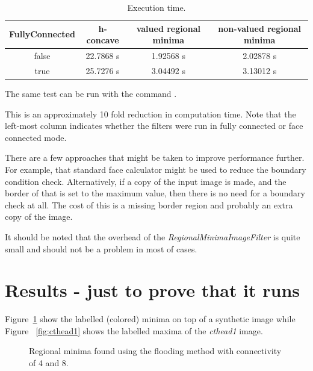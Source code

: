 \documentclass{InsightArticle}
\begin{document}
\begin{table}[htbp]
\centering
\begin{tabular}{cccc}
\hline
FullyConnected & h-concave & valued regional minima & non-valued regional minima \\
\hline
\hline
false & 22.7868 s & 1.92568 s & 2.02878 s\\
true  & 25.7276 s & 3.04492 s & 3.13012 s\\
\hline
\end{tabular}
\caption{Execution time.\label{perf}}
\end{table}

The same test can be run with the command .

This is an approximately 10 fold reduction in computation time. Note
that the left-most column indicates whether the filters were run in
fully connected or face connected mode.

There are a few approaches that might be taken to improve performance
further. For example, that standard face calculator might be used to
reduce the boundary condition check. Alternatively, if a copy of the
input image is made, and the border of that is set to the maximum
value, then there is no need for a boundary check at all. The cost of
this is a missing border region and probably an extra copy of the
image.

It should be noted that the overhead of the {\em RegionalMinimaImageFilter}
is quite small and should not be a problem in most of cases.

\section{Results - just to prove that it runs}
Figure~\ref{fig:artificial} show the labelled (colored) minima on top of
a synthetic image while Figure ~\ref{fig:cthead1} shows the labelled
maxima of the {\em cthead1} image.
\begin{figure}[htbp]
\begin{center}
\caption{Regional minima found using the flooding method with connectivity of 4 and 8.\label{fig:artificial}}
\end{center}
\end{figure}
\end{document}
